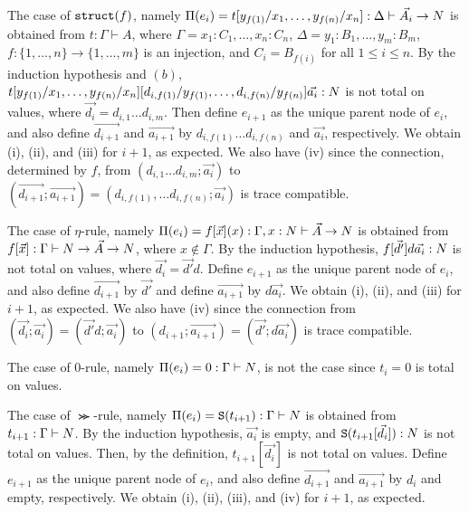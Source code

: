 \documentclass{article}
\newenvironment{proof}[1][Proof]{\begin{trivlist}
\item[\hskip \labelsep {\bfseries #1}]}{\end{trivlist}}
\begin{document}
\begin{proof}
  The case of ${\tt struct}(f)$, namely
  $\Pi(e_i) = t[y_{f(1)}/x_1,\ldots,y_{f(n)}/x_n]:\Delta\vdash \vec{A_i}\rightarrow{N}$
  is obtained from $t:\Gamma\vdash A$, where
  $\Gamma = x_1:C_1,\ldots,x_n:C_n$, $\Delta = y_1:B_1,\ldots,y_m:B_m$, 
  $f:\{1,\ldots,n\}\to\{1,\ldots,m\}$ is an injection, and $C_i=B_{f(i)}$ for all $1\le i\le n$.
  By the induction hypothesis and $(b)$,
  $t[y_{f(1)}/x_1,\ldots,y_{f(n)}/x_n][d_{i,f(1)}/y_{f(1)},\ldots,d_{i,f(n)}/y_{f(n)}]\vec{a_i}:{N}$ is not total on values, where $\vec{d_i} = d_{i,1}\ldots d_{i,m}$.
  Then define $e_{i+1}$ as the unique parent node of $e_i$, and
  also define $\vec{d_{i+1}}$ and $\vec{a_{i+1}}$ by $d_{i,f(1)}\ldots d_{i,f(n)}$
  and $\vec{a_i}$, respectively. 
  We obtain (i), (ii), and (iii) for $i+1$, as expected.
  We also have (iv) since the connection, determined by $f$, from
  $(d_{i,1}\ldots d_{i,m};\vec{a_i})$ to $(\vec{d_{i+1}};\vec{a_{i+1}}) = (d_{i,f(1)},\ldots d_{i,f(n)};\vec{a_i})$
  is trace compatible. 

  The case of $\eta$-rule, namely 
  $\Pi(e_i) = f[\vec{x}](x): \Gamma,x:N\vdash \vec{A}\rightarrow{N}$ is obtained from
  $f[\vec{x}]:\Gamma\vdash N\rightarrow \vec{A} \rightarrow {N}$, where
  $x\not\in\Gamma$.
  By the induction hypothesis, $f[\vec{d'}]d\vec{a_i}:{N}$ is not total on values,
  where $\vec{d_i} = \vec{d'}d$.
  Define $e_{i+1}$ as the unique parent node of $e_i$, and
  also define $\vec{d_{i+1}}$ by $\vec{d'}$ and define $\vec{a_{i+1}}$ by $d\vec{a_i}$. 
  We obtain (i), (ii), and (iii) for $i+1$, as expected.
  We also have (iv) since the connection from
  $(\vec{d_i};\vec{a_i}) = (\vec{d'}d;\vec{a_i})$ to
  $(d_{i+1};\vec{a_{i+1}}) = (\vec{d'};d\vec{a_i})$
  is trace compatible. 

  The case of $0$-rule, namely $\Pi(e_i) = 0:\Gamma\vdash {N}$, is not the case since $t_i = 0$ is total on values.
  
  The case of $\Succ$-rule, namely $\Pi(e_i) = {\tt S}(t_{i+1}):\Gamma\vdash {N}$ is obtained from
  $t_{i+1}:\Gamma\vdash {N}$.
  By the induction hypothesis, $\vec{a_i}$ is empty, and 
  ${\tt S}(t_{i+1}[\vec{d_i}]):{N}$ is not total on values.
  Then, by the definition, $t_{i+1}[\vec{d_i}]$ is not total on values. 
  Define $e_{i+1}$ as the unique parent node of $e_i$, and
  also define $\vec{d_{i+1}}$ and $\vec{a_{i+1}}$ by $d_i$ and empty, respectively. 
  We obtain (i), (ii), (iii), and (iv) for $i+1$, as expected.


\end{proof}
\end{document}
